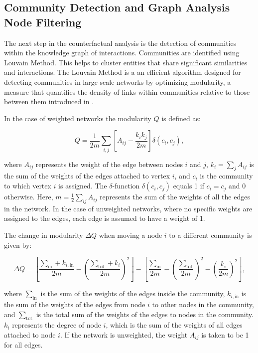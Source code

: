 \subsection{Community Detection and Graph Analysis Node Filtering}
The next step in the counterfactual analysis is the detection of communities within the knowledge graph of interactions.
Communities are identified using Louvain Method. This helps to cluster entities that
share significant similarities and interactions. The Louvain Method is a an
efficient algorithm designed for detecting communities in large-scale networks
by optimizing modularity, a measure that quantifies the density of links within communities
relative to those between them introduced in \parencite{blondel_fast_2008}. 

In the case of weighted networks the
modularity $Q$ is defined as:

\begin{equation}
	\label{eq:modularity}Q = \frac{1}{2m}\sum_{i,j}\left[ A_{ij}- \frac{k_{i} k_{j}}{2m}
	\right] \delta(c_{i}, c_{j}),
\end{equation}

where $A_{ij}$ represents the weight of the edge between nodes $i$ and $j$,
$k_{i} = \sum_{j}A_{ij}$ is the sum of the weights of the edges attached to
vertex $i$, and $c_{i}$ is the community to which vertex $i$ is assigned. The
$\delta$-function $\delta(c_{i}, c_{j})$ equals 1 if $c_{i} = c_{j}$ and 0
otherwise. Here, $m = \frac{1}{2}\sum_{ij}A_{ij}$ represents the sum of the
weights of all the edges in the network. In the case of unweighted networks,
where no specific weights are assigned to the edges, each edge is assumed to have
a weight of 1.

The change in modularity $\Delta Q$ when moving a node $i$ to a different
community is given by:

\begin{equation}
	\label{eq:delta_modularity}\Delta Q = \left[ \frac{\sum_{\text{in}}+ k_{i, \text{in}}}{2m}
	- \left( \frac{\sum_{\text{tot}}+ k_{i}}{2m}\right)^{2}\right] - \left[ \frac{\sum_{\text{in}}}{2m}
	- \left( \frac{\sum_{\text{tot}}}{2m}\right)^{2}- \left( \frac{k_{i}}{2m}\right
	)^{2}\right],
\end{equation}

where $\sum_{\text{in}}$ is the sum of the weights of the edges inside the community,
$k_{i, \text{in}}$ is the sum of the weights of the edges from node $i$ to other
nodes in the community, and $\sum_{\text{tot}}$ is the total sum of the weights of
the edges to nodes in the community. $k_{i}$ represents the degree of node $i$, which
is the sum of the weights of all edges attached to node $i$. If the network is
unweighted, the weight $A_{ij}$ is taken to be 1 for all edges.


